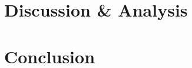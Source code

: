 \documentclass{acm_proc_article-sp}
\begin{document}
\section{Discussion \& Analysis}

\section{Conclusion}



  
%
%


\balancecolumns

\end{document}
